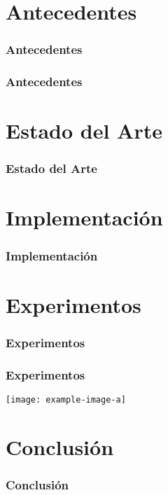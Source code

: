 \documentclass{beamer}
\begin{document}
\section{Antecedentes}

\begin{frame}
    \frametitle{Antecedentes}
    \blindtext[1]
\end{frame}

\begin{frame}
    \frametitle{Antecedentes}
    \blindtext[1]
\end{frame}


\section{Estado del Arte}
\begin{frame}
    \frametitle{Estado del Arte}
    \blindtext[1]
\end{frame}

\section{Implementación}
\begin{frame}
    \frametitle{Implementación}
    \blindtext[1]
\end{frame}

\section{Experimentos}
\begin{frame}

    \frametitle{Experimentos}
    \blindtext[1]

\end{frame}

\begin{frame}
    \frametitle{Experimentos}
    \texttt{[image: example-image-a]}
\end{frame}

\section{Conclusión}
\begin{frame}
    \frametitle{Conclusión}
    \blindtext[1]
\end{frame}
\end{document}
